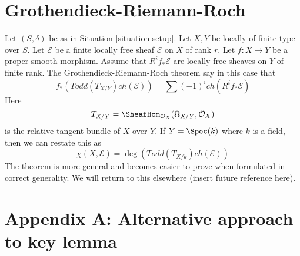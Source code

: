 \section{Grothendieck-Riemann-Roch}
\label{section-grr}

\noindent
Let $(S, \delta)$ be as in
Situation \ref{situation-setup}.
Let $X, Y$ be locally of finite type over $S$.
Let $\mathcal{E}$ be a finite locally free sheaf
${\mathcal E}$ on $X$ of rank $r$.
Let $f : X \to Y$ be a proper smooth morphism.
Assume that $R^if_*\mathcal{E}$ are locally free
sheaves on $Y$ of finite rank.
The Grothendieck-Riemann-Roch theorem say in this
case that
$$
f_*(Todd(T_{X/Y}) ch(\mathcal{E}))
=
\sum (-1)^i ch(R^if_*\mathcal{E})
$$
Here
$$
T_{X/Y} = \SheafHom_{\mathcal{O}_X}(\Omega_{X/Y}, \mathcal{O}_X)
$$
is the relative tangent bundle of $X$ over $Y$. If $Y = \Spec(k)$
where $k$ is a field, then we can restate this as
$$
\chi(X, \mathcal{E}) = \deg(Todd(T_{X/k}) ch(\mathcal{E}))
$$
The theorem is more general and becomes easier to prove
when formulated in correct generality. We will return to
this elsewhere (insert future reference here).



\section{Appendix A: Alternative approach to key lemma}
\label{section-appendix-A}

